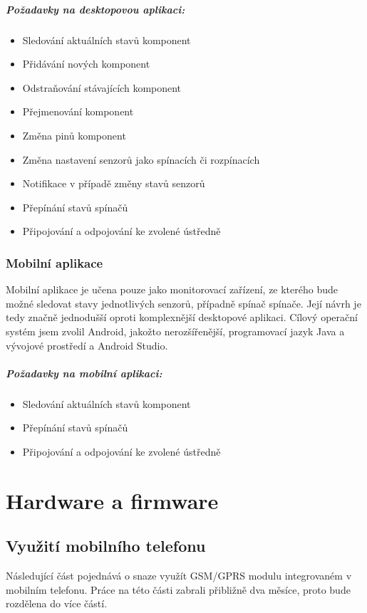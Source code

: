 \documentclass[FM,MP]{tulthesis}  %
\begin{document}
\paragraph{Požadavky na desktopovou aplikaci:}
\begin{itemize}
\item Sledování aktuálních stavů komponent
\item Přidávání nových komponent
\item Odstraňování stávajících komponent
\item Přejmenování komponent
\item Změna pinů komponent
\item Změna nastavení senzorů jako spínacích či rozpínacích
\item Notifikace v případě změny stavů senzorů
\item Přepínání stavů spínačů
\item Připojování a odpojování ke zvolené ústředně
\end{itemize} 

\subsection{Mobilní aplikace}
Mobilní aplikace je učena pouze jako monitorovací zařízení, ze kterého bude možné sledovat stavy jednotlivých senzorů, případně spínač spínače. Její návrh je tedy značně jednodušší oproti komplexnější desktopové aplikaci. Cílový operační systém jsem zvolil Android, jakožto nerozšířenější, programovací jazyk Java a vývojové prostředí a Android Studio.

\paragraph{Požadavky na mobilní aplikaci:}
\begin{itemize}
\item Sledování aktuálních stavů komponent
\item Přepínání stavů spínačů
\item Připojování a odpojování ke zvolené ústředně
\end{itemize} 


\chapter{Hardware a firmware}

\section{Využití mobilního telefonu}
Následující část pojednává o snaze využít GSM/GPRS modulu integrovaném v mobilním telefonu. Práce na této části zabrali přibližně dva měsíce, proto bude rozdělena do více částí.
\end{document}
